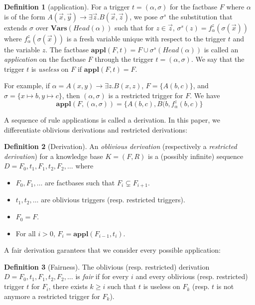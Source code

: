 \documentclass{article}
\theoremstyle{definition}
\newtheorem{definition}{Definition}[section]
\theoremstyle{remark}
\newcommand{\Vars}{\textbf{Vars}}
\newcommand{\Appl}{\textbf{appl}}
\begin{document}
\begin{definition}[application]
For a trigger $t = (\alpha,\sigma)$ for the factbase $F$ where $\alpha$ is of the form $A(\vec x,\vec y) \rightarrow \exists \vec z. B(\vec x,\vec z)$, we pose \emph{$\sigma^s$} the substitution that extends $\sigma$ over $\Vars(\textit{Head}(\alpha))$ such that for $z \in \vec z$, $\sigma^s(z) = f^z_\alpha(\sigma(\vec x))$ where $f^z_\alpha(\sigma(\vec x))$ is a fresh variable unique with respect to the trigger $t$ and the variable $z$.
The factbase $\Appl(F,t)=F \cup \sigma^s(\textit{Head}(\alpha))$ is called an \emph{application} on the factbase $F$ through the trigger $t = (\alpha,\sigma)$. We say that the trigger $t$ is \emph{useless} on $F$ if $\Appl(F,t) = F$.
\end{definition}

For example, if $\alpha = A(x,y) \rightarrow \exists z.B(x,z)$, $F = \{A(b,c)\}$, and $\sigma = \{x \mapsto b, y \mapsto c \}$, then $(\alpha,\sigma)$ is a restricted trigger for $F$. We have $$\Appl(F,(\alpha,\sigma)) = \{A(b,c),B(b,f_{\alpha}^z(b,c)\}$$

A sequence of rule applications is called a derivation. In this paper, we differentiate  oblivious derivations and restricted derivations:

\begin{definition}[Derivation]
An \emph{oblivious derivation} (respectively a \emph{restricted derivation}) for a knowledge base $K= (F,R)$ is a (possibly infinite) sequence $D=F_0,t_1,F_1,t_2,F_2,\ldots$ where 
\begin{itemize}
\item $F_0,F_1,\ldots$ are factbases such that $F_i \subsetneq F_{i+1}$.
\item $t_1,t_2,\ldots$ are oblivious triggers (resp. restricted triggers).
\item $F_0 = F$.
\item For all $i > 0$, $F_{i}= \Appl(F_{i-1},t_i)$.
\end{itemize}
\end{definition}

A fair derivation garantees that we consider every possible application:

\begin{definition}[Fairness]
The oblivious (resp. restricted) derivation $D=F_0,t_1,F_1,t_2,F_2,\ldots$ is \emph{fair} if for every $i$ and every oblivious (resp. restricted) trigger $t$ for $F_i$, there exists $k \geq i$ such that $t$ is useless on $F_k$ (resp. $t$ is not anymore a restricted trigger for $F_k$).
\end{definition}
\end{document}

